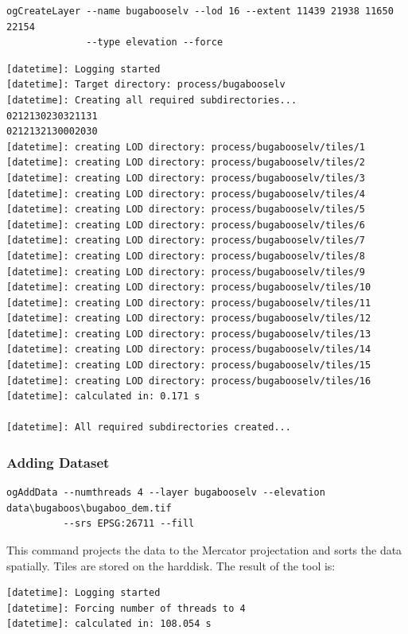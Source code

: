 \documentclass[
	12pt,
	a4paper,
	english,	
	appendixprefix,				     			        
	openany,		     	
	abstracton,		    		    
 	BCOR8mm,		    
]{scrartcl}
\begin{document}
\begin{lstlisting}
ogCreateLayer --name bugabooselv --lod 16 --extent 11439 21938 11650 22154 
              --type elevation --force
\end{lstlisting}


\begin{lstlisting}
[datetime]: Logging started
[datetime]: Target directory: process/bugabooselv
[datetime]: Creating all required subdirectories...
0212130230321131
0212132130002030
[datetime]: creating LOD directory: process/bugabooselv/tiles/1
[datetime]: creating LOD directory: process/bugabooselv/tiles/2
[datetime]: creating LOD directory: process/bugabooselv/tiles/3
[datetime]: creating LOD directory: process/bugabooselv/tiles/4
[datetime]: creating LOD directory: process/bugabooselv/tiles/5
[datetime]: creating LOD directory: process/bugabooselv/tiles/6
[datetime]: creating LOD directory: process/bugabooselv/tiles/7
[datetime]: creating LOD directory: process/bugabooselv/tiles/8
[datetime]: creating LOD directory: process/bugabooselv/tiles/9
[datetime]: creating LOD directory: process/bugabooselv/tiles/10
[datetime]: creating LOD directory: process/bugabooselv/tiles/11
[datetime]: creating LOD directory: process/bugabooselv/tiles/12
[datetime]: creating LOD directory: process/bugabooselv/tiles/13
[datetime]: creating LOD directory: process/bugabooselv/tiles/14
[datetime]: creating LOD directory: process/bugabooselv/tiles/15
[datetime]: creating LOD directory: process/bugabooselv/tiles/16
[datetime]: calculated in: 0.171 s

[datetime]: All required subdirectories created...
\end{lstlisting}

\subsubsection{Adding Dataset}

\begin{lstlisting}
ogAddData --numthreads 4 --layer bugabooselv --elevation data\bugaboos\bugaboo_dem.tif 
          --srs EPSG:26711 --fill
\end{lstlisting}

This command projects the data to the Mercator projectation and sorts the data spatially. Tiles are stored on the harddisk. The result of the tool is:

\begin{lstlisting}
[datetime]: Logging started
[datetime]: Forcing number of threads to 4
[datetime]: calculated in: 108.054 s
\end{lstlisting}
\end{document}
